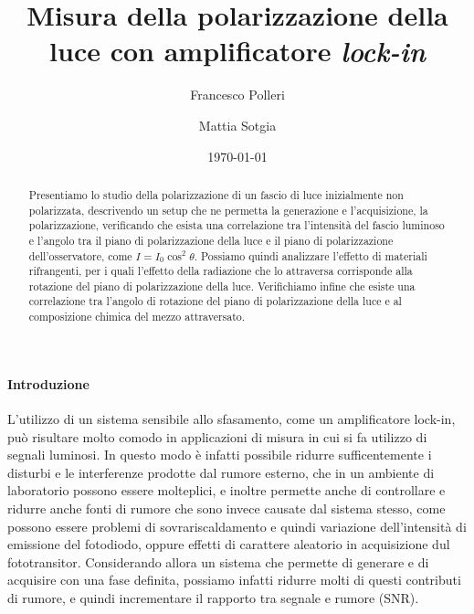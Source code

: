\documentclass[aps,twocolumn,prb,showpacs,floatfix,amsmath,amssymb,superscriptaddress, preprintnumbers, altaffilletter, amsmath, amssymb]{revtex4-1}
\begin{document}
\title{Misura della polarizzazione della luce con amplificatore \emph{lock-in}}
\author{Francesco Polleri}
\author{Mattia Sotgia}
\date{\today}

\begin{abstract}
Presentiamo lo studio della polarizzazione di un fascio di luce inizialmente non polarizzata, descrivendo un setup che ne permetta la generazione e l'acquisizione, la polarizzazione, verificando che esista una correlazione tra l'intensità del fascio luminoso e l'angolo tra il piano di polarizzazione della luce e il piano di polarizzazione dell'osservatore, come $I=I_0\cos^2\theta$. Possiamo quindi analizzare l'effetto di materiali rifrangenti, per i quali l'effetto della radiazione che lo attraversa corrisponde alla rotazione del piano di polarizzazione della luce. Verifichiamo infine che esiste una correlazione tra l'angolo di rotazione del piano di polarizzazione della luce e al composizione chimica del mezzo attraversato.
\end{abstract}

\maketitle

\paragraph*{Introduzione} L'utilizzo di un sistema sensibile allo sfasamento, come un amplificatore lock-in, può risultare molto comodo in applicazioni di misura in cui si fa utilizzo di segnali luminosi. In questo modo è infatti possibile ridurre sufficentemente i disturbi e le interferenze prodotte dal rumore esterno, che in un ambiente di laboratorio possono essere molteplici, e inoltre permette anche di controllare e ridurre anche fonti di rumore che sono invece causate dal sistema stesso, come possono essere problemi di sovrariscaldamento e quindi variazione dell'intensità di emissione del fotodiodo, oppure effetti di carattere aleatorio in acquisizione dul fototransitor. Considerando allora un sistema che permette di generare e di acquisire con una fase definita, possiamo infatti ridurre molti di questi contributi di rumore, e quindi incrementare il rapporto tra segnale e rumore (SNR). 




\appendix
\end{document}
